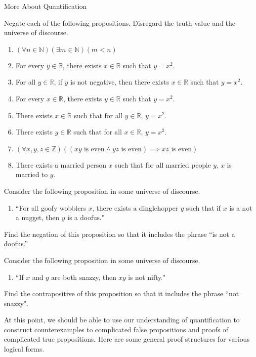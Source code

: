 \begin{section}{More About Quantification}
\begin{problem}
Negate each of the following propositions.  Disregard the truth value and the universe of discourse.
\begin{enumerate}[label=\textrm{(\alph*)}]
\item $(\forall n\in\mathbb{N})(\exists m\in\mathbb{N})(m<n)$
\item For every $y\in \mathbb{R}$, there exists $x\in \mathbb{R}$ such that $y=x^2$.
\item For all $y\in \mathbb{R}$, if $y$ is not negative, then there exists $x\in\mathbb{R}$ such that $y=x^2$.
\item For every $x\in \mathbb{R}$, there exists $y\in \mathbb{R}$ such that $y=x^2$.
\item There exists $x\in \mathbb{R}$ such that for all $y\in \mathbb{R}$, $y=x^2$.
\item There exists $y\in \mathbb{R}$ such that for all $x\in \mathbb{R}$, $y=x^2$.
\item $(\forall x,y,z\in\mathbb{Z})((xy \mbox{ is even}\wedge yz\mbox{ is even})\implies xz\mbox{ is even})$
\item There exists a married person $x$ such that for all married people $y$, $x$ is married to $y$.
\end{enumerate}
\end{problem}

\begin{problem}
Consider the following proposition in some universe of discourse.
\begin{enumerate}
\item[] ``For all goofy wobblers $x$, there exists a dinglehopper $y$ such that if $x$ is a not a nugget, then $y$ is a doofus."
\end{enumerate}
Find the negation of this proposition so that it includes the phrase ``is not a doofus.''
\end{problem}

\begin{problem}
Consider the following proposition in some universe of discourse.
\begin{enumerate}
\item[] ``If $x$ and $y$ are both snazzy, then $xy$ is not nifty."
\end{enumerate}
Find the contrapositive of this proposition so that it includes the phrase ``not snazzy".

\end{problem}

At this point, we should be able to use our understanding of quantification to construct counterexamples to complicated false propositions and proofs of complicated true propositions.  Here are some general proof structures for various logical forms.


\end{section}
